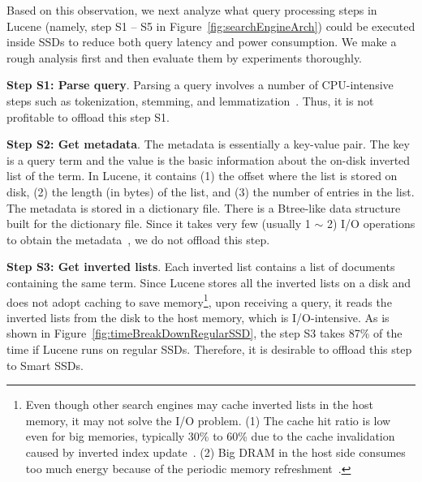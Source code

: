 


Based on this observation, we next analyze what query processing steps in Lucene (namely, step S1 -- S5 in Figure~\ref{fig:searchEngineArch}) could be executed inside SSDs to reduce both query latency and power consumption. We make a rough analysis first and then evaluate them by experiments thoroughly.

\textbf{Step S1: Parse query}. Parsing a query involves a number of CPU-intensive steps such as tokenization, stemming, and lemmatization~\cite{M08}. Thus, it is not profitable to offload this step S1.%

\textbf{Step S2: Get metadata}. The metadata is essentially a key-value pair. The key is a query term and the value is the basic information about the on-disk inverted list of the term.  In Lucene, it contains (1) the offset where the list is stored on disk, (2) the length (in bytes) of the list, and (3) the number of entries in the list. The metadata is stored in a dictionary file. There is a Btree-like data structure built for the dictionary file. Since it takes very few (usually 1 $\sim$ 2) I/O operations to obtain the metadata~\cite{M08}, we do not offload this step.

\textbf{Step S3: Get inverted lists}. Each inverted list contains a list of documents containing the same term.
Since Lucene stores all the inverted lists on a disk and does not adopt caching to save memory\footnote{\small Even though other search engines may cache inverted lists in the host memory, it may not solve the I/O problem. (1) The cache hit ratio is low even for big memories, typically 30\% to 60\% due to the cache invalidation caused by inverted index update~\cite{Barroso2003WSP}. (2) Big DRAM in the host side consumes too much energy because of the periodic memory refreshment~\cite{Hennessy2006}.}, upon receiving a query, it reads the inverted lists from the disk to the host memory, which is I/O-intensive.
As is shown in Figure~\ref{fig:timeBreakDownRegularSSD}, the step S3 takes 87\% of the time if Lucene runs on regular SSDs. Therefore, it is desirable to offload this step to Smart SSDs.


